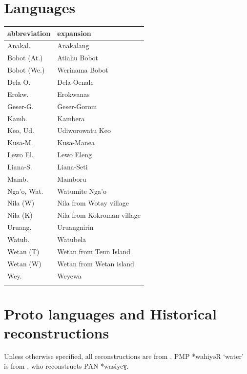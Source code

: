 \section*{Languages}\label{sec:Languages}
{\wg
\begin{tabular}{ll}
\lsptoprule				
{abbreviation}	&	{expansion}	\\	\midrule
Anakal.	&	Anakalang	\\
Bobot (At.)	&	Atiahu Bobot	\\
Bobot (We.)	&	Werinama Bobot	\\
Dela-O.	&	Dela-Oenale	\\
Erokw.	&	Erokwanas	\\
Geser-G.	&	Geser-Gorom	\\
Kamb.	&	Kambera	\\
Keo, Ud.	&	Udiworowatu Keo	\\
Kusa-M.	&	Kusa-Manea	\\
Lewo El.	&	Lewo Eleng	\\
Liana-S.	&	Liana-Seti	\\
Mamb.	&	Mamboru	\\
Nga'o, Wat.	&	Watumite Nga'o	\\
Nila (W)	&	Nila from Wotay village	\\
Nila (K)	&	Nila from Kokroman village	\\
Uruang.	&	Uruangnirin	\\
Watub.	&	Watubela	\\
Wetan (T)	&	Wetan from Teun Island	\\
Wetan (W)	&	Wetan from Wetan island	\\
Wey.	&	Weyewa	\\
\lspbottomrule
\end{tabular}
}



\newpage
\section*{Proto languages and Historical reconstructions}
Unless otherwise specified, all reconstructions are from \citet{BlustTrussel2020}.
PMP *wahiyəR ‘water’ is from \citet[1027]{Wolff2010}, who reconstructs PAN *wasiyeɣ.

